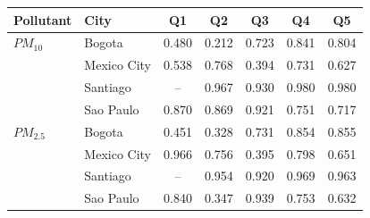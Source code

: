 \begin{tabular}{llccccc}
\toprule
Pollutant & City & Q1 & Q2 & Q3 & Q4 & Q5 \\
\midrule
$PM_{10}$ & Bogota & 0.480 & 0.212 & 0.723 & 0.841 & 0.804 \\
 & Mexico City & 0.538 & 0.768 & 0.394 & 0.731 & 0.627 \\
 & Santiago & -- & 0.967 & 0.930 & 0.980 & 0.980 \\
 & Sao Paulo & 0.870 & 0.869 & 0.921 & 0.751 & 0.717 \\
\addlinespace
$PM_{2.5}$ & Bogota & 0.451 & 0.328 & 0.731 & 0.854 & 0.855 \\
 & Mexico City & 0.966 & 0.756 & 0.395 & 0.798 & 0.651 \\
 & Santiago & -- & 0.954 & 0.920 & 0.969 & 0.963 \\
 & Sao Paulo & 0.840 & 0.347 & 0.939 & 0.753 & 0.632 \\
\bottomrule
\end{tabular}
